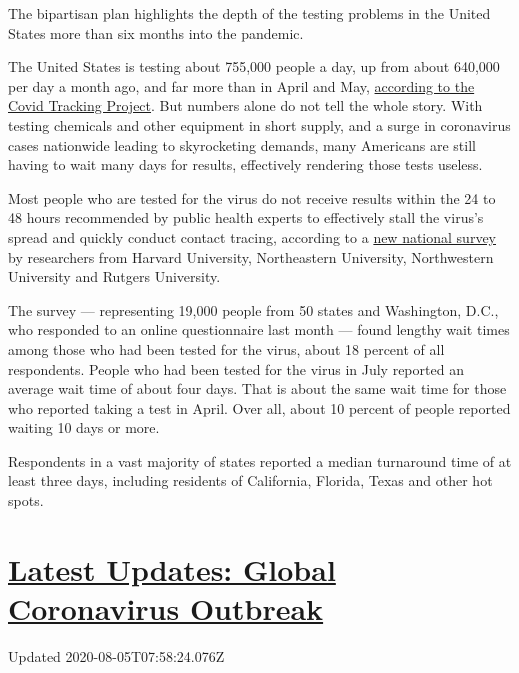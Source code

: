 The bipartisan plan highlights the depth of the testing problems in the
United States more than six months into the pandemic.

The United States is testing about 755,000 people a day, up from about
640,000 per day a month ago, and far more than in April and May,
\href{https://covidtracking.com/data/us-daily}{according to the Covid
Tracking Project}. But numbers alone do not tell the whole story. With
testing chemicals and other equipment in short supply, and a surge in
coronavirus cases nationwide leading to skyrocketing demands, many
Americans are still having to wait many days for results, effectively
rendering those tests useless.

Most people who are tested for the virus do not receive results within
the 24 to 48 hours recommended by public health experts to effectively
stall the virus's spread and quickly conduct contact tracing, according
to a
\href{https://covidstates.net/COVID19\%20CONSORTIUM\%20REPORT\%208\%20TEST\%20JULY\%202020.pdf}{new
national survey} by researchers from Harvard University, Northeastern
University, Northwestern University and Rutgers University.

The survey --- representing 19,000 people from 50 states and Washington,
D.C., who responded to an online questionnaire last month --- found
lengthy wait times among those who had been tested for the virus, about
18 percent of all respondents. People who had been tested for the virus
in July reported an average wait time of about four days. That is about
the same wait time for those who reported taking a test in April. Over
all, about 10 percent of people reported waiting 10 days or more.

Respondents in a vast majority of states reported a median turnaround
time of at least three days, including residents of California, Florida,
Texas and other hot spots.

\hypertarget{latest-updates-global-coronavirus-outbreak}{%
\section{\texorpdfstring{\href{https://www.nytimes3xbfgragh.onion/2020/08/04/world/coronavirus-cases.html?action=click\&pgtype=Article\&state=default\&region=MAIN_CONTENT_1\&context=storylines_live_updates}{Latest
Updates: Global Coronavirus
Outbreak}}{Latest Updates: Global Coronavirus Outbreak}}\label{latest-updates-global-coronavirus-outbreak}}

Updated 2020-08-05T07:58:24.076Z

